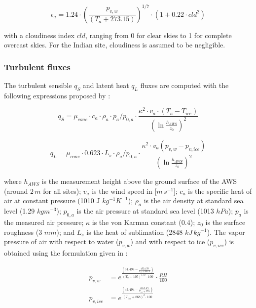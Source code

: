 \begin{equation}
	\epsilon_a=1.24 \cdot (\frac{p_{v,w}}{(T_a+273.15)})^{1/7}\cdot(1+0.22\cdot{cld}^2) \label{eqn:atm_e}
\end{equation}

with a cloudiness index $cld$, ranging from 0 for clear skies to 1 for complete overcast skies. For the Indian
site, cloudiness is assumed to be negligible.

\subsubsection{Turbulent fluxes} \label{sec:Qs}

The turbulent sensible $q_{S}$ and latent heat $q_{L}$ fluxes are computed with the following expressions
proposed by \cite{garrattAtmosphericBoundaryLayer1992}:

\begin{equation}
	q_{S}=\mu_{cone}\cdot c_{a} \cdot \rho_{a} \cdot p_{a}/p_{0,a} \cdot \frac{\kappa^2 \cdot v_a \cdot
		(T_a-T_{ice})}{{(\ln{\frac{h_{AWS}}{z_{0}}})}^2}
	\label{eqn:qs}
\end{equation}

\begin{equation}
	q_{L}=\mu_{cone}\cdot 0.623 \cdot L_s \cdot \rho_{a}/p_{0,a} \cdot \frac{\kappa^2 \cdot
	v_a(p_{v,w}-p_{v,ice})}{{(\ln{\frac{h_{AWS}}{z_{0}}})}^2}
\end{equation}

where $h_{AWS}$ is the measurement height above the ground surface of the \ac{AWS} (around $2\,m$ for all sites);
$v_a$ is the wind speed in [$m\,s^{-1}$]; $c_a$ is the specific heat of air at constant pressure (1010 J
$kg^{-1} K^{-1}$); $\rho_{a}$ is the air density at standard sea level (1.29 $kg m^{-3}$); $p_{0,a}$ is the air
pressure at standard sea level (1013 $hPa$); $p_{a}$ is the measured air pressure; $\kappa$ is the von Karman
constant (0.4); $z_{0}$ is the surface roughness (3 $mm$); and $L_s$ is the heat of sublimation (2848
$kJ\,kg^{-1}$). The vapor pressure of air with respect to water ($p_{v,w}$) and with respect to ice
($p_{v,ice}$) is obtained using the formulation given in \cite{huangSimpleAccurateFormula2018}:

\begin{equation}
	\begin{split}
		p_{v,w}&=e^{\frac{(34.494 - \frac{4924.99}{T_{a} + 237.1})}{(T_a + 105)^{1.57} \cdot 100}} \cdot \frac{RH}{100} \\
		p_{v,ice}&=e^{\frac{(43.494 - \frac{6545.89}{T_{ice} + 278})}{(T_{ice} + 868)^{2} \cdot 100}} \\
	\end{split} \label{eqn:vp}
\end{equation}

